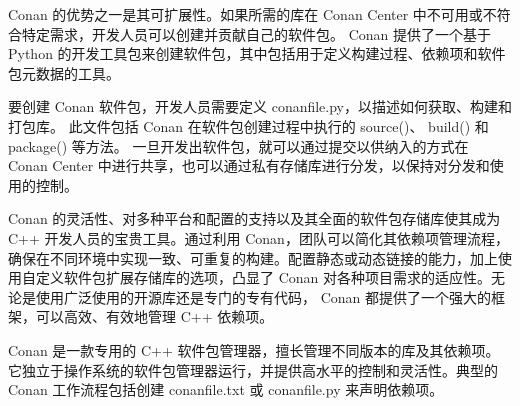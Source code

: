 
Conan 的优势之一是其可扩展性。如果所需的库在 Conan Center 中不可用或不符合特定需求，开发人员可以创建并贡献自己的软件包。 Conan 提供了一个基于 Python 的开发工具包来创建软件包，其中包括用于定义构建过程、依赖项和软件包元数据的工具。

要创建 Conan 软件包，开发人员需要定义 conanfile.py，以描述如何获取、构建和打包库。
此文件包括 Conan 在软件包创建过程中执行的 source()、 build() 和 package() 等方法。
一旦开发出软件包，就可以通过提交以供纳入的方式在 Conan Center 中进行共享，也可以通过私有存储库进行分发，以保持对分发和使用的控制。

Conan 的灵活性、对多种平台和配置的支持以及其全面的软件包存储库使其成为 C++ 开发人员的宝贵工具。通过利用 Conan，团队可以简化其依赖项管理流程，确保在不同环境中实现一致、可重复的构建。配置静态或动态链接的能力，加上使用自定义软件包扩展存储库的选项，凸显了 Conan 对各种项目需求的适应性。无论是使用广泛使用的开源库还是专门的专有代码， Conan 都提供了一个强大的框架，可以高效、有效地管理 C++ 依赖项。

Conan 是一款专用的 C++ 软件包管理器，擅长管理不同版本的库及其依赖项。它独立于操作系统的软件包管理器运行，并提供高水平的控制和灵活性。典型的 Conan 工作流程包括创建 conanfile.txt 或 conanfile.py 来声明依赖项。



















